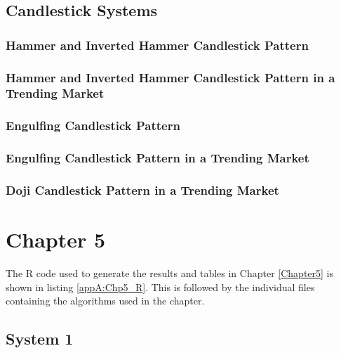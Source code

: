 \subsection{Candlestick Systems}
\subsubsection{Hammer and Inverted Hammer Candlestick Pattern}
\label{appA:Hammer}


\subsubsection{Hammer and Inverted Hammer Candlestick Pattern in a Trending Market}
\label{appA:Hammer_aroon}


\subsubsection{Engulfing Candlestick Pattern}
\label{appA:Engulf}


\subsubsection{Engulfing Candlestick Pattern in a Trending Market}
\label{appA:Engulf_aroon}


\subsubsection{Doji Candlestick Pattern in a Trending Market}
\label{appA:Doji_aroon}


\section{Chapter 5}
The R code used to generate the results and tables in Chapter \ref{Chapter5} is shown in listing \ref{appA:Chp5_R}. This is followed by the individual files containing the algorithms used in the chapter.

\label{appA:Chp5_R}


\subsection{System 1}
\label{appA:ts_1}



